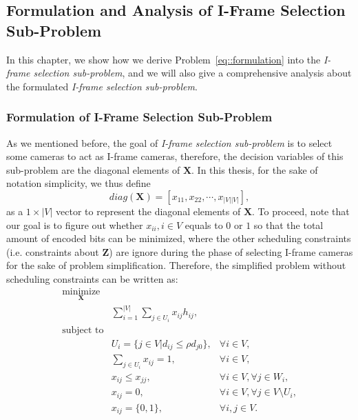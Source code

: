 \subsection{Formulation and Analysis of I-Frame Selection Sub-Problem}
\label{sec::iFrameSelectionSubProb}
In this chapter, we show how we derive Problem~\eqref{eq::formulation} into the \emph{I-frame selection sub-problem}, and we will also give a comprehensive analysis about the formulated \emph{I-frame selection sub-problem}.
%
\subsubsection{Formulation of I-Frame Selection Sub-Problem}
\label{sec::iFrameSelectionSubProbFormulation}
As we mentioned before, the goal of \emph{I-frame selection sub-problem} is to select some cameras to act as I-frame cameras, therefore, the decision variables of this sub-problem are the diagonal elements of $\mathbf{X}$.
In this thesis, for the sake of notation simplicity, we thus define
\begin{equation}
diag(\mathbf{X}) = \left[ x_{11}, x_{22}, \cdots, x_{|V||V|} \right],
\end{equation}
as a $1 \times |V|$ vector to represent the diagonal elements of $\mathbf{X}$.
To proceed, note that our goal is to figure out whether ${x_{ii},i \in V}$ equals to $0$ or $1$ so that the total amount of encoded bits can be minimized, where the other scheduling constraints (i.e. constraints about $\mathbf{Z}$) are ignore during the phase of selecting I-frame cameras for the sake of problem simplification.
Therefore, the simplified problem without scheduling constraints can be written as:
\begin{align}
\underset{\mathbf{X}}{\text{minimize}} & & \nonumber \\
	&\sum_{i=1}^{|V|} \sum_{j \in U_i}  x_{ij} h_{ij}, & \nonumber \\
\text{subject to} & & \nonumber \\
	&U_i = \{ j \in V | d_{ij} \leq \rho d_{j0} \}, &\forall i \in V, \nonumber \\
	&\sum_{j \in U_i} x_{ij} = 1, &\forall i \in V, \nonumber \\
	&x_{ij} \leq x_{jj}, &\forall i \in V, \forall j \in W_i, \nonumber \\
	&x_{ij} = 0, &\forall i \in V, \forall j \in V \setminus U_i, \nonumber \\
	&x_{ij} = \{0,1\}, &\forall i,j \in V.
\label{eq::formulationSimplified}
\end{align}
